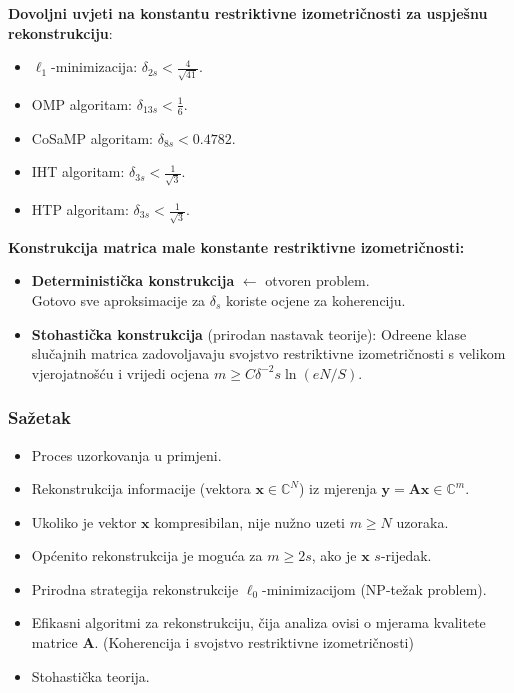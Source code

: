 \documentclass{beamer}
\newcommand{\C}{\mathbb{C}}
\newcommand{\vect}[1]{\mathbf{#1}}
\renewcommand{\vec}{\vect}
\begin{document}
\begin{frame}
    \textbf{Dovoljni uvjeti na konstantu restriktivne izometri\v{c}nosti za uspje\v{s}nu rekonstrukciju}:
        \medskip
\begin{itemize}
    \item{$\ell_1$-minimizacija}: $\delta_{2s} < \frac{4}{\sqrt{41}}$.
        \medskip
    \item{OMP algoritam}: $\delta_{13s} < \frac{1}{6}$.
        \medskip
    \item{CoSaMP algoritam}: $\delta_{8s} < 0.4782$.
        \medskip
    \item{IHT algoritam}: $\delta_{3s} < \frac{1}{\sqrt{3}}$. 
        \medskip
    \item{HTP algoritam}: $\delta_{3s} < \frac{1}{\sqrt{3}}$.
\end{itemize}

\end{frame}

\begin{frame}
    \textbf{Konstrukcija matrica male konstante restriktivne izometri\v{c}nosti:}
    \bigskip
    \begin{itemize}
        \item \textbf{Deterministi\v{c}ka konstrukcija} $\leftarrow$ otvoren problem. \\
            Gotovo sve aproksimacije za $\delta_s$ koriste ocjene za koherenciju.
            \bigskip
        \item \textbf{Stohasti\v{c}ka konstrukcija} (prirodan nastavak teorije): Odre\dj ene klase slu\v{c}ajnih matrica zadovoljavaju svojstvo restriktivne izometri\v{c}nosti s velikom vjerojatno\v{s}\'cu i vrijedi ocjena $m \geq C \delta^{-2}s \ln(eN/S)$.
    \end{itemize}
\end{frame}

\begin{frame}
    \frametitle{Sa\v{z}etak}
    \begin{itemize}
        \item Proces uzorkovanja u primjeni.
        \item Rekonstrukcija informacije (vektora $\vec x \in \C^N$) iz mjerenja $\vec y = \vec{Ax} \in \C^m$.
        \item Ukoliko je vektor $\vec x$ kompresibilan, nije nu\v{z}no uzeti $m \geq N$ uzoraka.
        \item Op\'cenito rekonstrukcija je mogu\'ca za $m \geq 2s$, ako je $\vec x$ $s$-rijedak.
        \item Prirodna strategija rekonstrukcije $\ell_0$-minimizacijom (NP-te\v{z}ak problem).
        \item Efikasni algoritmi za rekonstrukciju, \v{c}ija analiza ovisi o mjerama kvalitete matrice $\vec A$. (Koherencija i svojstvo restriktivne izometri\v{c}nosti)
        \item Stohasti\v{c}ka teorija.
    \end{itemize}
\end{frame}
\end{document}
